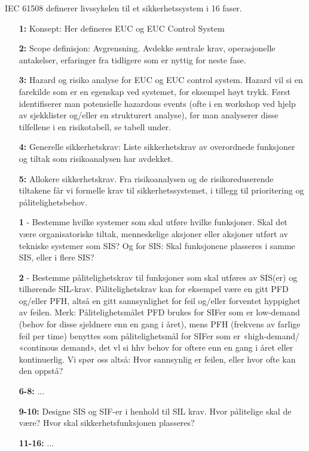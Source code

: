 IEC 61508 definerer livssykelen til et sikkerhetssystem i 16 faser.

\begin{itemize}
    \item[\textbf{1:}] Konsept:  Her defineres EUC og EUC Control System
    \item[\textbf{2:}] Scope definisjon: Avgrensning. Avdekke sentrale krav, operasjonelle antakelser, erfaringer fra tidligere som er nyttig for neste fase.
    \item[\textbf{3:}] Hazard og risiko analyse for EUC og EUC control system. Hazard vil si en farekilde som er en egenskap ved systemet, for eksempel høyt trykk. Først identifiserer man potensielle hazardous events (ofte i en workshop ved hjelp av sjekklister og/eller en strukturert analyse), før man analyserer disse tilfellene i en risikotabell, se tabell under.
    \item[\textbf{4:}] Generelle sikkerhetskrav: Liste sikkerhetskrav av overordnede funksjoner og tiltak som risikoanalysen har avdekket.
    \item[\textbf{5:}] Allokere sikkerhetskrav. Fra risikoanalysen og de risikoreduserende tiltakene får vi formelle krav til sikkerhetssystemet, i tillegg til prioritering og pålitelighetsbehov. 
    
    \textbf{1} - Bestemme hvilke systemer som skal utføre hvilke funksjoner. Skal det være organisatoriske tiltak, menneskelige aksjoner eller aksjoner utført av tekniske systemer som SIS? Og for SIS: Skal funksjonene plasseres i samme SIS, eller i flere SIS?
    
    \textbf{2} - Bestemme pålitelighetskrav til funksjoner som skal utføres av SIS(er) og tilhørende SIL-krav. Pålitelighetskrav kan for eksempel være en gitt PFD og/eller PFH, altså en gitt sannsynlighet for feil og/eller forventet hyppighet av feilen. Merk: Pålitelighetsmålet PFD brukes for SIFer som er low-demand (behov for disse sjeldnere enn en gang i året), mens PFH (frekvens av farlige feil per time) benyttes som pålitelighetsmål for SIFer som er «high-demand/ «continous demand», det vl si hhv behov for oftere enn en gang i året eller kontinuerlig. Vi spør oss altså: Hvor sannsynlig er feilen, eller hvor ofte kan den oppstå?
    
    \item[\textbf{6-8:}] ...
    \item[\textbf{9-10:}] Designe SIS og SIF-er i henhold til SIL krav. Hvor pålitelige skal de være? Hvor skal sikkerhetsfunksjonen plasseres?
    \item[\textbf{11-16:}] ...

\end{itemize}

